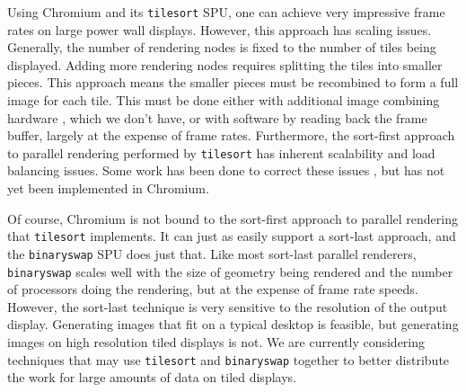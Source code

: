 \documentclass{acmsiggraph}
\newcommand{\cidentifier}[1]{\texttt{#1}}
\begin{document}
  Using Chromium and its \cidentifier{tile\-sort} SPU, one can achieve very
  impressive frame rates on large power wall displays.  However, this
  approach has scaling issues.  Generally, the number of rendering nodes is
  fixed to the number of tiles being displayed.  Adding more rendering
  nodes requires splitting the tiles into smaller pieces.  This approach
  means the smaller pieces must be recombined to form a full image for each
  tile.  This must be done either with additional image combining hardware
  \cite{Stoll01}, which we don't have, or with software by reading back the
  frame buffer, largely at the expense of frame rates.  Furthermore, the
  sort-first approach to parallel rendering performed by
  \cidentifier{tile\-sort} has inherent scalability and load balancing
  issues.  Some work has been done to correct these issues
  \cite{Samanta99}, but has not yet been implemented in Chromium.

  Of course, Chromium is not bound to the sort-first approach to parallel
  rendering that \cidentifier{tile\-sort} implements.  It can just as
  easily support a sort-last approach, and the \cidentifier{binary\-swap}
  SPU does just that.  Like most sort-last parallel renderers,
  \cidentifier{binary\-swap} scales well with the size of geometry being
  rendered and the number of processors doing the rendering, but at the
  expense of frame rate speeds.  However, the sort-last technique is very
  sensitive to the resolution of the output display.  Generating images
  that fit on a typical desktop is feasible, but generating images on high
  resolution tiled displays is not.  We are currently considering
  techniques that may use \cidentifier{tile\-sort} and
  \cidentifier{binary\-swap} together to better distribute the work for
  large amounts of data on tiled displays.

\end{document}
